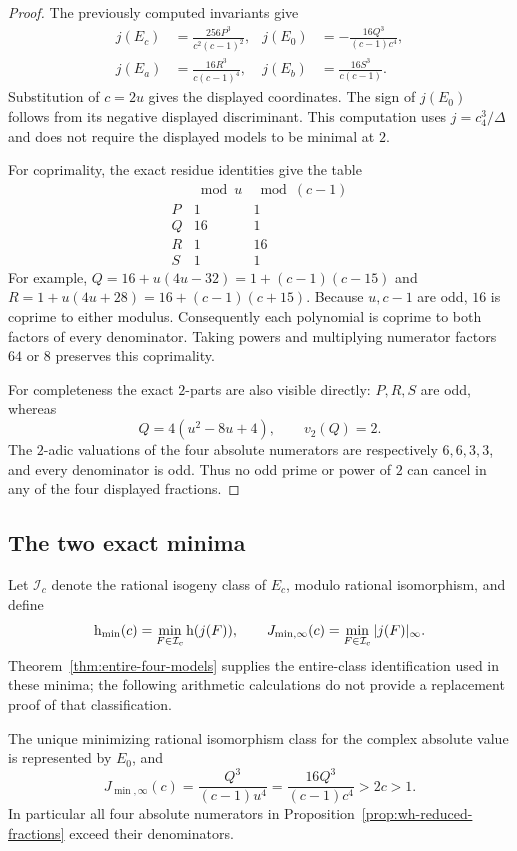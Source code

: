 \begin{proof}
The previously computed invariants give
\[
 \begin{aligned}
 j(E_c)&=\frac{256P^3}{c^2(c-1)^2},&
 j(E_0)&=-\frac{16Q^3}{(c-1)c^4},\\
 j(E_a)&=\frac{16R^3}{c(c-1)^4},&
 j(E_b)&=\frac{16S^3}{c(c-1)}.
 \end{aligned}
\]
Substitution of $c=2u$ gives the displayed coordinates.
The sign of $j(E_0)$ follows from its negative displayed
discriminant. This computation uses $j=c_4^3/\Delta$ and does not
require the displayed models to be minimal at $2$.

For coprimality, the exact residue identities give the table
\[
\begin{array}{c|cc}
 &\bmod u&\bmod(c-1)\\ \hline
 P&1&1\\
 Q&16&1\\
 R&1&16\\
 S&1&1
\end{array}
\]
For example,
$Q=16+u(4u-32)=1+(c-1)(c-15)$ and
$R=1+u(4u+28)=16+(c-1)(c+15)$.
Because $u,c-1$ are odd, $16$ is coprime to either modulus.
Consequently each polynomial is coprime to both factors of every
denominator. Taking powers and multiplying numerator factors
$64$ or $8$ preserves this coprimality.

For completeness the exact $2$-parts are also visible directly:
$P,R,S$ are odd, whereas
\[
 Q=4(u^2-8u+4),\qquad v_2(Q)=2.
\]
The $2$-adic valuations of the four absolute numerators are
respectively $6,6,3,3$, and every denominator is odd.
Thus no odd prime or power of $2$ can cancel in any of the
four displayed fractions.
\end{proof}

\subsection{The two exact minima}

Let $\mathcal I_c$ denote the rational isogeny class of $E_c$,
modulo rational isomorphism, and define
\[
 \mathrm h_{\min}(c)=\min_{F\in\mathcal I_c}\mathrm h(j(F)),\qquad
 J_{\min,\infty}(c)=\min_{F\in\mathcal I_c}|j(F)|_\infty.
\]
Theorem~\ref{thm:entire-four-models} supplies the entire-class
identification used in these minima; the following arithmetic
calculations do not provide a replacement proof of that
classification.

\begin{lemma}\label{lem:wh-complex-minimum}
The unique minimizing rational isomorphism class for the complex
absolute value is represented by $E_0$, and
\begin{equation}\label{eq:wh-complex-minimum}
 J_{\min,\infty}(c)
   =\frac{Q^3}{(c-1)u^4}
   =\frac{16Q^3}{(c-1)c^4}>2c>1.
\end{equation}
In particular all four absolute numerators in
Proposition~\ref{prop:wh-reduced-fractions} exceed their denominators.
\end{lemma}

